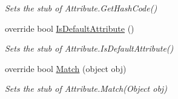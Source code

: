 \begin{DoxyCompactItemize}
\begin{DoxyCompactList}\small\item\em Sets the stub of Attribute.\-Get\-Hash\-Code()\end{DoxyCompactList}\item 
override bool \hyperlink{class_system_1_1_runtime_1_1_remoting_1_1_proxies_1_1_fakes_1_1_stub_proxy_attribute_af17bea255274a5b8d7c829b314131df9}{Is\-Default\-Attribute} ()
\begin{DoxyCompactList}\small\item\em Sets the stub of Attribute.\-Is\-Default\-Attribute()\end{DoxyCompactList}\item 
override bool \hyperlink{class_system_1_1_runtime_1_1_remoting_1_1_proxies_1_1_fakes_1_1_stub_proxy_attribute_a8ccd18d7dbdcf5b057a98ed3dc3bfdfb}{Match} (object obj)
\begin{DoxyCompactList}\small\item\em Sets the stub of Attribute.\-Match(\-Object obj)\end{DoxyCompactList}\end{DoxyCompactItemize}
